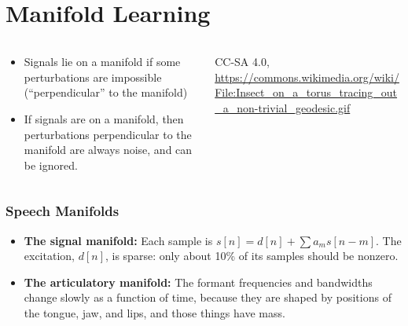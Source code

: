 \documentclass{beamer}
\begin{document}
\section[Manifolds]{Manifold Learning}
\setcounter{subsection}{1}

\begin{frame}
  \begin{columns}
    \begin{column}{0.5\textwidth}
      \begin{itemize}
      \item Signals lie on a manifold if some perturbations are
        impossible (``perpendicular'' to the manifold)
      \item If signals are on a manifold, then perturbations
        perpendicular to the manifold are always noise, and can be
        ignored.
      \end{itemize}
    \end{column}
    \begin{column}{0.5\textwidth}
      \begin{center}

        \begin{tiny}
          CC-SA 4.0, \url{https://commons.wikimedia.org/wiki/File:Insect_on_a_torus_tracing_out_a_non-trivial_geodesic.gif}
        \end{tiny}
      \end{center}
    \end{column}
  \end{columns}
\end{frame}

\begin{frame}
  \frametitle{Speech Manifolds}

  \begin{itemize}
  \item {\bf The signal manifold:} Each sample is $s[n]=d[n]+\sum a_m
    s[n-m]$.  The excitation, $d[n]$, is sparse: only about 10\% of
    its samples should be nonzero.
  \item {\bf The articulatory manifold:} The formant frequencies and
    bandwidths change slowly as a function of time, because they are
    shaped by positions of the tongue, jaw, and lips, and those things
    have mass.
  \end{itemize}
\end{frame}
\end{document}
